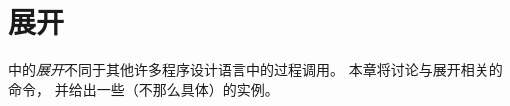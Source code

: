 \documentclass{book}
\begin{document}
\chapter{展开}\label{expand}

中的\emph{展开}不同于其他许多程序设计语言中的过程调用。
本章将讨论与展开相关的命令，
并给出一些（不那么具体）的实例。

\label{cschap:relax}\label{cschap:expandafter}\label{cschap:noexpand}\label{cschap:afterassignment}\label{cschap:the}
\end{document}
